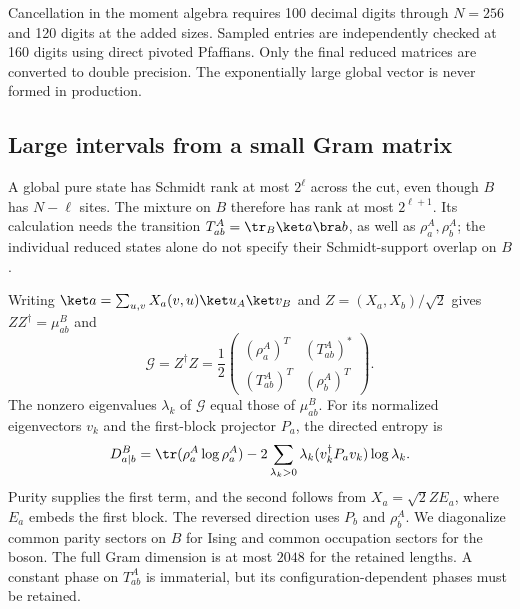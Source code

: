 Cancellation in the moment algebra requires 100 decimal digits
through $N=256$ and 120 digits at the added sizes. Sampled
entries are independently checked at 160 digits using direct
pivoted Pfaffians. Only the final reduced matrices are converted
to double precision. The exponentially large global vector is
never formed in production.

\subsection{Large intervals from a small Gram matrix}
\label{app:num-gram}
A global pure state has Schmidt rank at most $2^\ell$ across
the cut, even though $B$ has $N-\ell$ sites. The mixture on $B$
therefore has rank at most $2^{\ell+1}$. Its calculation needs
the transition $T_{ab}^A=\tr_B\ket a\bra b$, as well as
$\rho_a^A,\rho_b^A$; the individual reduced states alone do
not specify their Schmidt-support overlap on $B$.

Writing $\ket a=\sum_{u,v}X_a(v,u)\ket u_A\ket v_B$ and
$Z=(X_a,X_b)/\sqrt2$ gives $ZZ^\dagger=\mu_{ab}^B$ and
\begin{equation}
 \mathcal G=Z^\dagger Z=\frac12
 \begin{pmatrix}(\rho_a^A)^T&(T_{ab}^A)^*\\
 (T_{ab}^A)^T&(\rho_b^A)^T\end{pmatrix}.
 \label{eq:num-gram}
\end{equation}
The nonzero eigenvalues $\lambda_k$ of $\mathcal G$ equal
those of $\mu_{ab}^B$. For its normalized eigenvectors $v_k$
and the first-block projector $P_a$, the directed entropy is
\begin{equation}
 D^B_{a\mid b}=\tr(\rho_a^A\log\rho_a^A)
 -2\sum_{\lambda_k>0}\lambda_k(v_k^\dagger P_av_k)\log\lambda_k.
 \label{eq:num-gram-entropy}
\end{equation}
Purity supplies the first term, and the second follows from
$X_a=\sqrt2ZE_a$, where $E_a$ embeds the first block.
The reversed direction uses $P_b$ and $\rho_b^A$.
We diagonalize common parity sectors on $B$ for Ising and
common occupation sectors for the boson. The full Gram
dimension is at most $2048$ for the retained lengths.
A constant phase on $T_{ab}^A$ is immaterial, but its
configuration-dependent phases must be retained.

